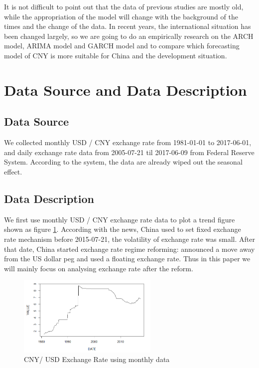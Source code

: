 \documentclass[12pt, a4paper, titlepage]{article}
\begin{document}
It is not difficult to point out that the data of previous studies are mostly old, while the appropriation of the model will change with the background of the times and the change of the data. In recent years, the international situation has been changed largely, so we are going to do an empirically research on the ARCH model, ARIMA model and GARCH model and to compare which forecasting model of CNY is more suitable for China and the development situation.\\

\section{Data Source and Data Description}
\subsection{Data Source}
We collected monthly USD / CNY exchange rate from 1981-01-01 to 2017-06-01, and daily exchange rate data from 2005-07-21 til 2017-06-09 from Federal Reserve System. According to the system, the data are already wiped out the seasonal effect.\\

\subsection{Data Description}
We first use monthly USD / CNY exchange rate data  to plot a trend figure shown as figure \ref{monthly}. According with the news, China used to set fixed exchange rate mechanism before 2015-07-21, the volatility of exchange rate was small. After that date, China started exchange rate regime reforming: announced a move away from the US dollar peg and used a floating exchange rate. Thus in this paper we will mainly focus on analysing exchange rate after the reform.\\ 
\begin{figure}[h!]
\begin{center}
\caption{CNY/ USD Exchange Rate using monthly data}\label{monthly}
\includegraphics[width=0.6\textwidth]{monthly.png} 
\end{center}
\end{figure}
\end{document}

